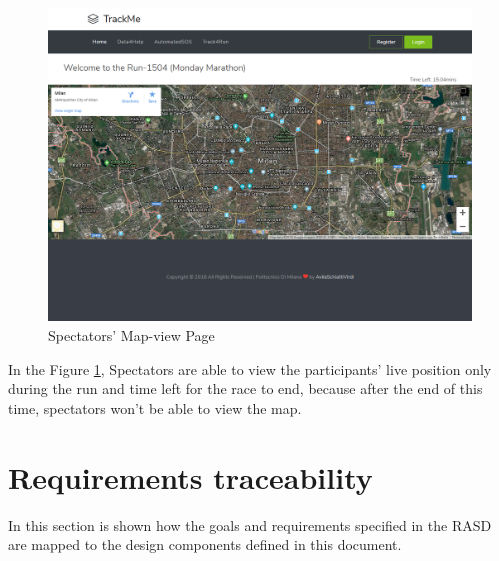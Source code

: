 \documentclass[a4paper, hidelinks, 12pt]{report}
\begin{document}
	
	\begin{figure}[H]
		\centering
		\includegraphics[width=1\textwidth]{UI/spectators_map.png}
		\caption[UI: Spectators' Map-view Page]{Spectators' Map-view Page}
		\label{fig:Spectators' Map-view Page}
	\end{figure}
	
	In the Figure \ref{fig:Spectators' Map-view Page}, Spectators are able to view  the participants' live position only during the run and time left for the race to end, because after the end of this time, spectators won't be able to view the map.
	
	\chapter{Requirements traceability}
	In this section is shown how the goals and requirements specified in the RASD are mapped to the design components defined in this document.
	
\end{document}
